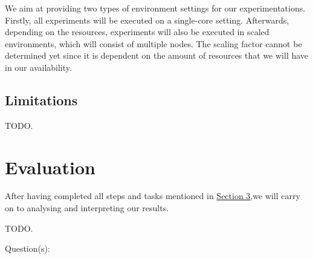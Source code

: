 \documentclass[a4paper,11pt]{article}
\begin{document}
\par We aim at providing two types of environment settings for our experimentations. Firstly, all experiments will be executed on a single-core setting. Afterwards, depending on the resources, experiments will also be executed in scaled environments, which will consist of multiple nodes. The scaling factor cannot be determined yet since it is dependent on the amount of resources that we will have in our availability.

\subsection{Limitations} \label{limitations}

TODO.


\section{Evaluation} \label{evaluation}

\par After having completed all steps and tasks mentioned in \hyperref[methodology]{Section 3},we will carry on to analysing and interpreting our results.

\medskip

\par TODO.

\medskip

\par Question(s): 
\end{document}
